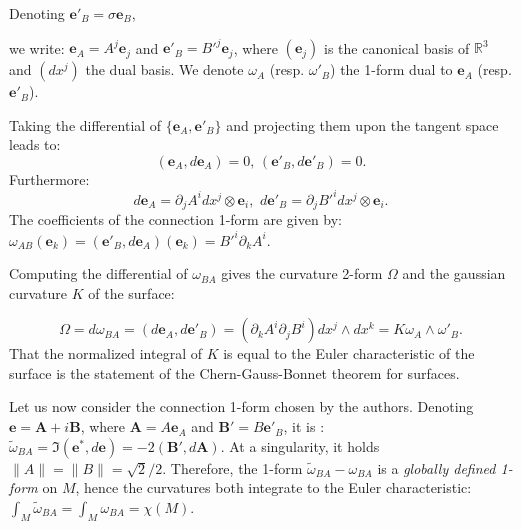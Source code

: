 \documentclass[aps, prl,12pt,reprint]{revtex4-2}
\def \e{\mathbf{e}}
\def \A{\textbf{A}}
\def \B{\textbf{B}}
\begin{document}
Denoting $\e'_B=\sigma \e_B$,































we write: $\e_A=A^j \e_j$ and $\e'_B=B'^j \e_j$, where $(\e_j)$ is the canonical basis of $\mathbb{R}^3$ and $(dx^j)$ the dual basis. We denote $\omega_A$ (resp. $\omega'_{B}$) the 1-form dual to $\e_A$ (resp. $\e'_B$).



Taking the differential of $\{\e_A,\e'_B\}$ and projecting them upon the tangent space leads to:
$$
(\e_A,d\e_A)=0,\, (\e'_B,d\e'_B)=0.
$$
Furthermore:
$$
d\e_A=\partial_j A^i dx^j \otimes \e_i ,\,\,d\e'_B=\partial_j B'^i dx^j \otimes \e_i.
$$
The coefficients of the connection 1-form are given by: $\omega_{AB}(\e_k)=(\e'_B,d\e_A)(\e_k)=B'^i \partial_k A^i$.




Computing the differential of $\omega_{BA}$ gives the curvature 2-form $\Omega$ and the gaussian curvature $K$ of the surface:











$$
\Omega=d\omega_{BA}=(d\e_A,d\e'_B)=(\partial_k A^i \partial_j B^i) dx^j\wedge dx^k=K \omega_A \wedge \omega'_B.
$$
That the normalized integral of $K$ is equal to the Euler characteristic of the surface is the statement of the Chern-Gauss-Bonnet theorem \cite[p. 102]{docarmo} for surfaces.

Let us now consider the connection 1-form chosen by the authors. Denoting $\e=\A+i\B$, where $\A=A \e_A$ and $\B'=B\e'_B$, it is : $\tilde{\omega}_{BA}=\Im(\e^*,d\e)=-2(\B',d\A)$. At a singularity, it holds $\|A\|=\|B\|=\sqrt{2}/2$. Therefore, the 1-form $\tilde{\omega}_{BA}-{\omega}_{BA}$ is a \textit{globally defined 1-form} on $M$, hence the curvatures both integrate to the Euler characteristic: $\int_M \tilde{\omega}_{BA}=\int_M {\omega}_{BA}=\chi(M)$.
\end{document}
